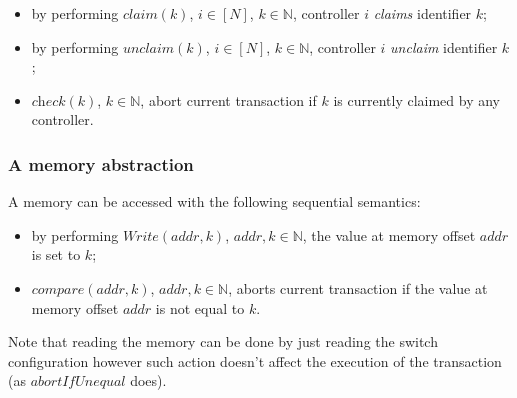 \documentclass[conference]{sigcomm-alternate}
\newcommand{\Nat}{\mathbb{N}}
\newcommand{\claimcheck}{check\xspace}
\newcommand{\compare}{compare\xspace}
\begin{document}
\begin{itemize}
\item by performing $\textit{claim}(k)$, $i\in[N]$,
  $k\in\Nat$, controller $i$ \emph{claims} 
  identifier $k$;


\item by performing $\textit{unclaim}(k)$, $i\in[N]$, $k\in\Nat$, controller $i$
  \emph{unclaim} identifier $k$;  

\item $\textit{\claimcheck}(k)$, $k\in\Nat$, 
abort current transaction if $k$ is currently claimed by any controller.

\end{itemize}  

\subsubsection{A memory abstraction}
A memory can be accessed with the following sequential
semantics:

\begin{itemize}
\item by performing $\textit{Write}(addr,k)$,
  $addr,k\in\Nat$, the value at memory offset $addr$ is set to $k$;

\item $\textit{\compare}(addr,k)$, $addr,k\in\Nat$, 
aborts current transaction if the value at memory offset $addr$ is not equal to $k$.

\end{itemize}  

Note that reading the memory can be done by just reading the switch configuration however such action doesn't affect the execution of the transaction (as $\textit{abortIfUnequal}$ does).
\end{document}

